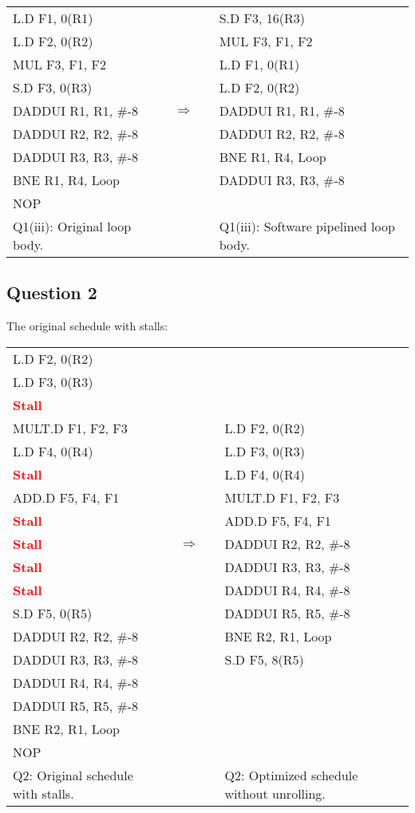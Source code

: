 \documentclass[11pt]{article}
\newcommand{\q}[1]{\subsection*{Question {#1}}}
\newcommand{\code}[1]{\textsf{#1}}
\newcommand{\stall}{\textcolor{red}{\textbf{Stall}}}
\begin{document}
\begin{table}[h]
\center
\begin{tabular}{lcccl}
	 \code{L.D F1, 0(R1)} & & & & \code{S.D F3, 16(R3)} \\
	 \code{L.D F2, 0(R2)}  & & & & \code{MUL F3, F1, F2}\\
	 \code{MUL F3, F1, F2}  & & & & \code{L.D F1, 0(R1)} \\
	 \code{S.D F3, 0(R3)} & & & & \code{L.D F2, 0(R2)} \\
	 \code{DADDUI R1, R1, \#-8} & & $\Rightarrow$ & & \code{DADDUI R1, R1, \#-8} \\
	 \code{DADDUI R2, R2, \#-8} & & & & \code{DADDUI R2, R2, \#-8} \\
	 \code{DADDUI R3, R3, \#-8} & & & & \code{BNE R1, R4, Loop} \\
	 \code{BNE R1, R4, Loop} & & & & \code{DADDUI R3, R3, \#-8} \\
	 \code{NOP} & & & & \\
	 Q1(iii): Original loop body. & & & & Q1(iii): Software pipelined loop body.
\end{tabular}
\label{tbl:q1p3}
\end{table}

\q{2} The original schedule with stalls:

\begin{table}[h]
\begin{tabular}{lcccl}
	 \code{L.D F2, 0(R2)} & & & & \\
	 \code{L.D F3, 0(R3)} & & & & \\
	 \stall & & & &\\
	 \code{MULT.D F1, F2, F3} & & & & \code{L.D F2, 0(R2)} \\
	 \code{L.D F4, 0(R4)} & & & & \code{L.D F3, 0(R3)} \\
	 \stall & & & & \code{L.D F4, 0(R4)} \\
	 \code{ADD.D F5, F4, F1} & & & & \code{MULT.D F1, F2, F3} \\
	 \stall & & & & \code{ADD.D F5, F4, F1} \\
	 \stall & & $\Rightarrow$ & & \code{DADDUI R2, R2, \#-8} \\
	 \stall & & & & \code{DADDUI R3, R3, \#-8} \\
	 \stall & & & & \code{DADDUI R4, R4, \#-8} \\
	 \code{S.D F5, 0(R5)} & & & & \code{DADDUI R5, R5, \#-8} \\
	 \code{DADDUI R2, R2, \#-8} & & & & \code{BNE R2, R1, Loop} \\
	 \code{DADDUI R3, R3, \#-8} & & & & \code{S.D F5, 8(R5)} \\
	 \code{DADDUI R4, R4, \#-8} & & & &\\
	 \code{DADDUI R5, R5, \#-8} & & & & \\
	 \code{BNE R2, R1, Loop} & & & &\\
	 \code{NOP} & & & &\\
	 Q2: Original schedule with stalls. & & & & Q2: Optimized schedule without unrolling.
\end{tabular}
\label{tbl:q2}
\end{table}
\end{document}
